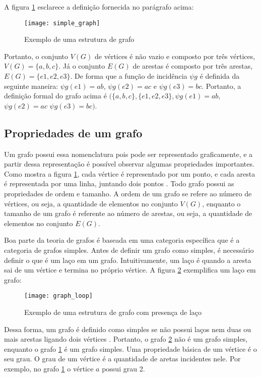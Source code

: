 	A figura \ref{graph_definition} esclarece a definição fornecida no parágrafo acima:
	
\begin{figure}[H]
	\centering
    \texttt{[image: simple\_graph]}
    \caption{Exemplo de uma estrutura de grafo}
    \label{graph_definition}
\end{figure}

	Portanto, o conjunto \(V(G)\) de vértices é não vazio e composto por três vértices, \(V(G)=\{a,b,c\}\). Já o conjunto \(E(G)\) de arestas é composto por três arestas, \(E(G)=\{e1,e2,e3\}\). De forma que a função de incidência \(\psi g\) é definida da seguinte maneira: \(\psi g(e1)= ab\), \(\psi g(e2)= ac\) e \(\psi g(e3)= bc\). Portanto, a definição formal do grafo acima é \((\{a,b,c\}, \{e1,e2,e3\}, \psi g(e1)= ab\), \(\psi g(e2)= ac\) \(\psi g(e3)= bc)\).
	
\subsection{Propriedades de um grafo}
	Um grafo possui essa nomenclatura pois pode ser representado graficamente, e a partir dessa representação é possível observar algumas propriedades importantes. Como mostra a figura \ref{graph_definition}, cada vértice é representado por um ponto, e cada aresta é representada por uma linha, juntando dois pontos \cite{bondy1976graph}. Todo grafo possui as propriedades de ordem e tamanho. A ordem de um grafo se refere ao número de vértices, ou seja, a quantidade de elementos no conjunto \(V(G)\), enquanto o tamanho de um grafo é referente ao número de arestas, ou seja, a quantidade de elementos no conjunto \(E(G)\).
	
	Boa parte da teoria de grafos é baseada em uma categoria específica que é a categoria de grafos simples. Antes de definir um grafo como simples, é necessário definir o que é um laço em um grafo. Intuitivamente, um laço é quando a aresta sai de um vértice e termina no próprio vértice. A figura \ref{graph_loop} exemplifica um laço em grafo: 

\begin{figure}[H]
	\centering
    \texttt{[image: graph\_loop]}
    \caption{Exemplo de uma estrutura de grafo com presença de laço}
    \label{graph_loop}
\end{figure}

	Dessa forma, um grafo é definido como simples se não possui laços nem duas ou mais arestas ligando dois vértices \cite{bondy1976graph}. Portanto, o grafo \ref{graph_loop} não é um grafo simples, enquanto o grafo \ref{graph_definition} é um grafo simples. Uma propriedade básica de um vértice é o seu grau. O grau de um vértice é a quantidade de aretas incidentes nele. Por exemplo, no grafo \ref{graph_definition} o vértice \(a\) possui grau 2.
	

